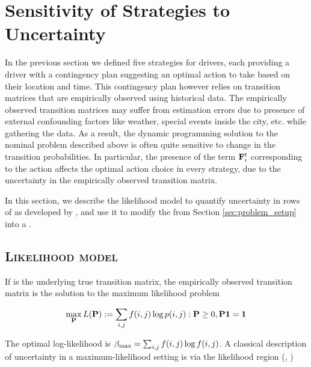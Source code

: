 
\section{Sensitivity of Strategies to Uncertainty}
\label{sec:sensitivity}

In the previous section we defined five strategies for drivers, each providing a driver with a contingency plan suggesting an optimal action to take based on their location and time. This contingency plan however relies on transition matrices {\empiricaltransitionmatrix} that are empirically observed using historical data. The empirically observed transition matrices may suffer from estimation errors due to presence of external confounding factors like weather, special events inside the city, etc. while gathering the data. As a result, the dynamic programming solution to the nominal problem described above is often quite sensitive to change in the transition probabilities. In particular, the presence of the term ${\mathbf{F}}_{i}^{t}$ corresponding to the {\getpassenger} action affects the optimal action choice in every strategy, due to the uncertainty in the empirically observed transition matrix.

In this section, we describe the likelihood model to quantify uncertainty in rows of {\empiricaltransitionmatrix} as developed by \citet{nilim2004robustness}, and use it to modify the {\nominalproblem} from Section \ref{sec:problem_setup} into a {\robustcontrolproblem}.

\subsection{\textsc{Likelihood model}}
\label{sec:likelihood_model}

If {\truetransitionmatrix} is the underlying true transition matrix, the empirically observed transition matrix {\empiricaltransitionmatrix} is the solution to the maximum likelihood problem

\begin{equation}
\max_{\mathbf{P}} L({\mathbf{P}}) := \sum_{i,j}f(i,j) \log{p(i,j)} : {\mathbf{P}} \geq 0, {\mathbf{P}}\mathbf{1} = \mathbf{1} 
\end{equation}

The optimal log-likelihood is $\beta_{\textrm{max}}= \sum_{i,j}f(i,j)\log{f(i,j)}$.
A classical description of uncertainty in a maximum-likelihood setting is via the likelihood region (\citet{lehmann2006theory}, \citet{poor2013introduction})

